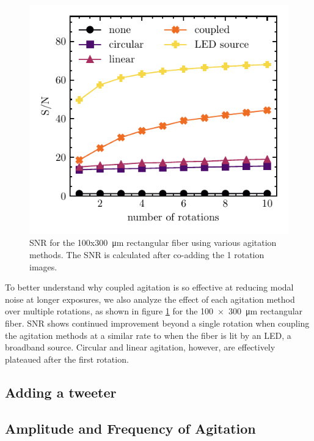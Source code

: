 \documentclass[twocolumn]{emulateapj}
\begin{document}
\begin{figure}
\centering
	\includegraphics[width=\columnwidth]{images/rect_snr_vs_time.pdf}
	\caption{SNR for the 100x\SI{300}{\micro\meter} rectangular fiber using various agitation methods. The SNR is calculated after co-adding the 1 rotation images.}
\label{fig:rect_snr_vs_time}
\end{figure}

To better understand why coupled agitation is so effective at reducing modal noise at longer exposures, we also analyze the effect of each agitation method over multiple rotations, as shown in figure \ref{fig:rect_snr_vs_time} for the \SI{100x300}{\micro\meter} rectangular fiber. SNR shows continued improvement beyond a single rotation when coupling the agitation methods at a similar rate to when the fiber is lit by an LED, a broadband source. Circular and linear agitation, however, are effectively plateaued after the first rotation.

\subsection{Adding a tweeter}


\subsection{Amplitude and Frequency of Agitation}
\label{subsec:amp_freq}
\end{document}
